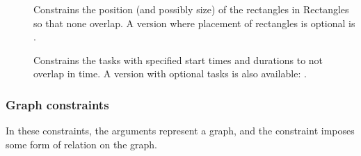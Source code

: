 \begin{description}
\item[]
Constrains the position (and possibly size) of the rectangles in
Rectangles so that none overlap. A version where placement of rectangles is 
optional is
.

\item[]
Constrains the tasks with specified start times and durations to not overlap in time. A version with optional tasks is also available:
.

\end{description}

\subsubsection{Graph constraints}

In these constraints, the arguments represent a graph, and the
 constraint imposes some form of relation on the graph.

